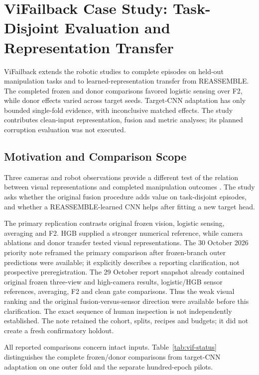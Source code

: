 \chapter{ViFailback Case Study: Task-Disjoint Evaluation and Representation Transfer}
\label{ch:vifailback}

ViFailback extends the robotic studies to complete episodes on held-out manipulation
tasks and to learned-representation transfer from REASSEMBLE. The completed frozen and
donor comparisons favored logistic sensing over F2, while donor effects varied across
target seeds. Target-CNN adaptation has only bounded single-fold evidence, with
inconclusive matched effects. The study contributes clean-input representation, fusion
and metric analyses; its planned corruption evaluation was not executed.

\section{Motivation and Comparison Scope}
Three cameras and robot observations provide a different test of the relation between
visual representations and completed manipulation outcomes \citep{Zeng2026ViFailback}.
The study asks whether the original fusion procedure adds value on task-disjoint
episodes, and whether a REASSEMBLE-learned CNN helps after fitting a new target head.

The primary replication contrasts original frozen vision, logistic sensing, averaging
and F2. HGB supplied a stronger numerical reference, while camera ablations and donor
transfer tested visual representations. The 30 October 2026 priority note reframed the primary comparison after frozen-branch
outer predictions were available; it explicitly describes a reporting clarification,
not prospective preregistration. The 29 October report snapshot already contained
original frozen three-view and high-camera results, logistic/HGB sensor references,
averaging, F2 and clean gate comparisons. Thus the weak visual ranking and the original
fusion-versus-sensor direction were available before this clarification. The exact
sequence of human inspection is not independently established. The note retained the
cohort, splits, recipes and budgets; it did not create a fresh confirmatory holdout.

All reported comparisons concern intact inputs. Table~\ref{tab:vif-status} distinguishes
the complete frozen/donor comparisons from target-CNN adaptation on one outer fold and
the separate hundred-epoch pilots.

